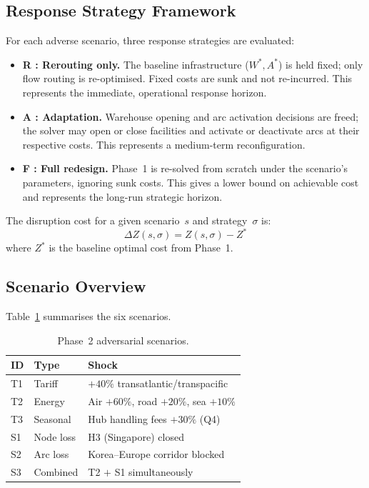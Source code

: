
 \subsection{Response Strategy Framework}

For each adverse scenario, three response strategies are evaluated:

\begin{itemize}[leftmargin=*,itemsep=2pt]
  \item \textbf{R : Rerouting only.} The baseline infrastructure
    ($W^*, A^*$) is held fixed; only flow routing is re-optimised.
    Fixed costs are sunk and not re-incurred. This represents the
    immediate, operational response horizon.

  \item \textbf{A : Adaptation.} Warehouse opening and arc activation
    decisions are freed; the solver may open or close facilities and
    activate or deactivate arcs at their respective costs. This represents
    a medium-term reconfiguration.

  \item \textbf{F : Full redesign.} Phase~1 is re-solved from scratch under
    the scenario's parameters, ignoring sunk costs. This gives a lower bound
    on achievable cost and represents the long-run strategic horizon.
\end{itemize}

The disruption cost for a given scenario~$s$ and strategy~$\sigma$ is:
\begin{equation}
  \Delta Z(s,\sigma) = Z(s,\sigma) - Z^*
  \label{eq:deltaz}
\end{equation}
where $Z^*$ is the baseline optimal cost from Phase~1.

\subsection{Scenario Overview}

Table~\ref{tab:scenarios} summarises the six scenarios.

\begin{table}[H]
\centering
\caption{Phase~2 adversarial scenarios.}
\label{tab:scenarios}
\begin{tabular}{lll}
\toprule
\textbf{ID} & \textbf{Type} & \textbf{Shock} \\
\midrule
T1 & Tariff      & $+40\%$ transatlantic/transpacific \\
T2 & Energy      & Air $+60\%$, road $+20\%$, sea $+10\%$ \\
T3 & Seasonal    & Hub handling fees $+30\%$ (Q4) \\
S1 & Node loss   & H3 (Singapore) closed \\
S2 & Arc loss    & Korea--Europe corridor blocked \\
S3 & Combined    & T2 $+$ S1 simultaneously \\
\bottomrule
\end{tabular}
\end{table}

